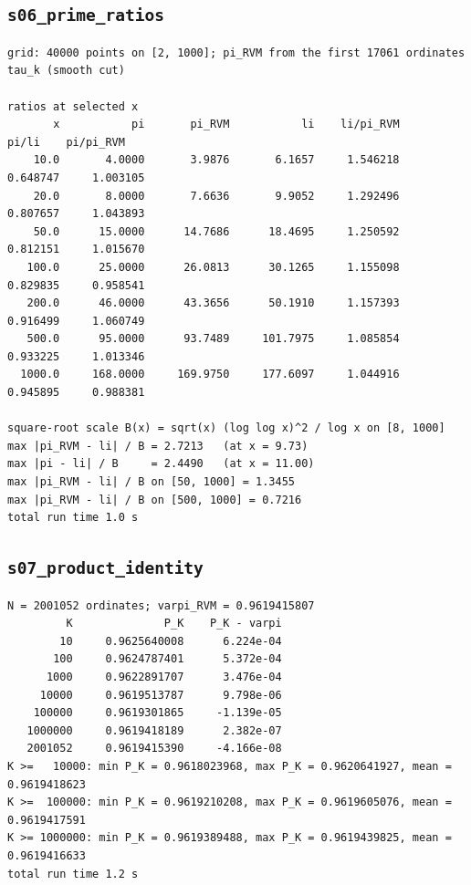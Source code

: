 \documentclass[11pt,reqno]{amsart}
\numberwithin{equation}{section}
\theoremstyle{plain}
\theoremstyle{definition}
\theoremstyle{remark}
\begin{document}
\subsection{\texttt{s06\_prime\_ratios}}
\label{app:out-s06-prime-ratios}

\begin{lstlisting}[style=out]
grid: 40000 points on [2, 1000]; pi_RVM from the first 17061 ordinates tau_k (smooth cut)

ratios at selected x
       x           pi       pi_RVM           li    li/pi_RVM        pi/li    pi/pi_RVM
    10.0       4.0000       3.9876       6.1657     1.546218     0.648747     1.003105
    20.0       8.0000       7.6636       9.9052     1.292496     0.807657     1.043893
    50.0      15.0000      14.7686      18.4695     1.250592     0.812151     1.015670
   100.0      25.0000      26.0813      30.1265     1.155098     0.829835     0.958541
   200.0      46.0000      43.3656      50.1910     1.157393     0.916499     1.060749
   500.0      95.0000      93.7489     101.7975     1.085854     0.933225     1.013346
  1000.0     168.0000     169.9750     177.6097     1.044916     0.945895     0.988381

square-root scale B(x) = sqrt(x) (log log x)^2 / log x on [8, 1000]
max |pi_RVM - li| / B = 2.7213   (at x = 9.73)
max |pi - li| / B     = 2.4490   (at x = 11.00)
max |pi_RVM - li| / B on [50, 1000] = 1.3455
max |pi_RVM - li| / B on [500, 1000] = 0.7216
total run time 1.0 s
\end{lstlisting}

\subsection{\texttt{s07\_product\_identity}}
\label{app:out-s07-product-identity}

\begin{lstlisting}[style=out]
N = 2001052 ordinates; varpi_RVM = 0.9619415807
         K              P_K    P_K - varpi
        10     0.9625640008      6.224e-04
       100     0.9624787401      5.372e-04
      1000     0.9622891707      3.476e-04
     10000     0.9619513787      9.798e-06
    100000     0.9619301865     -1.139e-05
   1000000     0.9619418189      2.382e-07
   2001052     0.9619415390     -4.166e-08
K >=   10000: min P_K = 0.9618023968, max P_K = 0.9620641927, mean = 0.9619418623
K >=  100000: min P_K = 0.9619210208, max P_K = 0.9619605076, mean = 0.9619417591
K >= 1000000: min P_K = 0.9619389488, max P_K = 0.9619439825, mean = 0.9619416633
total run time 1.2 s
\end{lstlisting}
\end{document}
